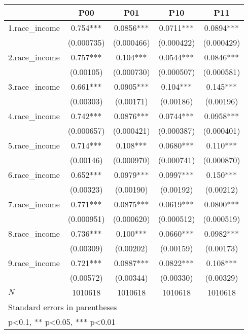 {
\def\sym#1{\ifmmode^{#1}\else\(^{#1}\)\fi}
\begin{tabular}{l*{4}{c}}
\hline\hline
            &\multicolumn{1}{c}{P00}&\multicolumn{1}{c}{P01}&\multicolumn{1}{c}{P10}&\multicolumn{1}{c}{P11}\\
\hline
1.race\_income&       0.754***&      0.0856***&      0.0711***&      0.0894***\\
            &  (0.000735)   &  (0.000466)   &  (0.000422)   &  (0.000429)   \\
[1em]
2.race\_income&       0.757***&       0.104***&      0.0544***&      0.0846***\\
            &   (0.00105)   &  (0.000730)   &  (0.000507)   &  (0.000581)   \\
[1em]
3.race\_income&       0.661***&      0.0905***&       0.104***&       0.145***\\
            &   (0.00303)   &   (0.00171)   &   (0.00186)   &   (0.00196)   \\
[1em]
4.race\_income&       0.742***&      0.0876***&      0.0744***&      0.0958***\\
            &  (0.000657)   &  (0.000421)   &  (0.000387)   &  (0.000401)   \\
[1em]
5.race\_income&       0.714***&       0.108***&      0.0680***&       0.110***\\
            &   (0.00146)   &  (0.000970)   &  (0.000741)   &  (0.000870)   \\
[1em]
6.race\_income&       0.652***&      0.0979***&      0.0997***&       0.150***\\
            &   (0.00323)   &   (0.00190)   &   (0.00192)   &   (0.00212)   \\
[1em]
7.race\_income&       0.771***&      0.0875***&      0.0619***&      0.0800***\\
            &  (0.000951)   &  (0.000620)   &  (0.000512)   &  (0.000519)   \\
[1em]
8.race\_income&       0.736***&       0.100***&      0.0660***&      0.0982***\\
            &   (0.00309)   &   (0.00202)   &   (0.00159)   &   (0.00173)   \\
[1em]
9.race\_income&       0.721***&      0.0887***&      0.0822***&       0.108***\\
            &   (0.00572)   &   (0.00344)   &   (0.00330)   &   (0.00329)   \\
\hline
\(N\)       &     1010618   &     1010618   &     1010618   &     1010618   \\
\hline\hline
\multicolumn{5}{l}{\footnotesize Standard errors in parentheses}\\
\multicolumn{5}{l}{\footnotesize * p<0.1, ** p<0.05, *** p<0.01}\\
\end{tabular}
}
